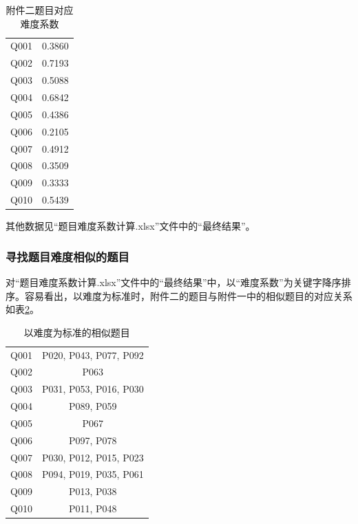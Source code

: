 \begin{table}[htbp]
    \centering
    \label{tableDiff}
    \caption{附件二题目对应难度系数}
    \begin{tabular}{@{}cc@{}}
    \toprule
    \quad\quad\quad\quad{}\quad\quad\quad\quad\quad & \quad\quad\quad\quad{}\quad\quad\quad\quad\quad\\ \midrule
    Q001 & 0.3860 \\
    Q002 & 0.7193 \\
    Q003 & 0.5088 \\
    Q004 & 0.6842 \\
    Q005 & 0.4386 \\
    Q006 & 0.2105 \\
    Q007 & 0.4912 \\
    Q008 & 0.3509 \\
    Q009 & 0.3333 \\
    Q010 & 0.5439 \\ \bottomrule
    \end{tabular}
\end{table}

其他数据见“题目难度系数计算.xlsx”文件中的“最终结果”。

\subsubsection{寻找题目难度相似的题目}

对“题目难度系数计算.xlsx”文件中的“最终结果”中，以“难度系数”为关键字降序排序。容易看出，以难度为标准时，附件二的题目与附件一中的相似题目的对应关系如表\ref{tablesmr}。

\begin{table}[htbp]
    \centering
    \label{tablesmr}
    \caption{以难度为标准的相似题目}
    \begin{tabular}{@{}cc@{}}
    \toprule
    \quad\quad\quad\quad{}\quad\quad\quad\quad\quad & \quad\quad\quad\quad{}\quad\quad\quad\quad\quad\\ \midrule
    Q001 & P020, P043, P077, P092 \\
    Q002 & P063 \\
    Q003 & P031, P053, P016, P030 \\
    Q004 & P089, P059 \\
    Q005 & P067 \\
    Q006 & P097, P078 \\
    Q007 & P030, P012, P015, P023 \\
    Q008 & P094, P019, P035, P061 \\
    Q009 & P013, P038 \\
    Q010 & P011, P048 \\ \bottomrule
    \end{tabular}
\end{table}

